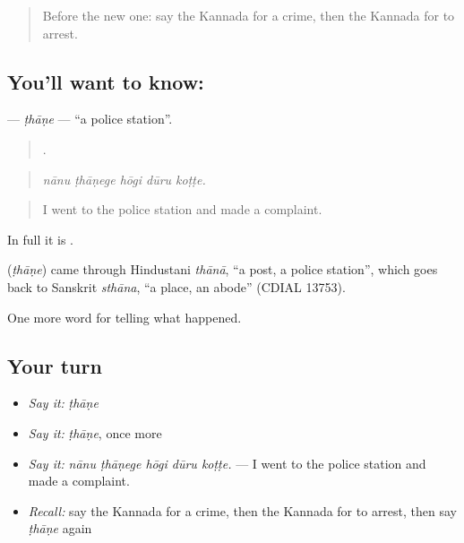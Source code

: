 \label{lesson:KA-C323-thane}



\begin{quote}
Before the new one: say the Kannada for a crime, then the Kannada for to arrest.
\end{quote}

\subsection*{You'll want to know: }
\textbf{} — \emph{ṭhāṇe} — \textquotedblleft{}a police station\textquotedblright{}.

\begin{quote}
    .
\end{quote}

\begin{quote}
\emph{nānu ṭhāṇege hōgi dūru koṭṭe.}
\end{quote}

\begin{quote}
I went to the police station and made a complaint.
\end{quote}

In full it is  .

\begin{cousinweb}
\textbf{} (\emph{ṭhāṇe}) came through Hindustani \emph{thānā}, \textquotedblleft{}a post, a police station\textquotedblright{}, which goes back to Sanskrit \emph{sthāna}, \textquotedblleft{}a place, an abode\textquotedblright{} (CDIAL 13753).
\end{cousinweb}

\begin{grammarlens}[title={What you've built}]
One more word for telling what happened.
\end{grammarlens}

\subsection*{Your turn}
\begin{itemize}
\raggedright
  \item \emph{Say it:} \emph{ṭhāṇe}
  \item \emph{Say it:} \emph{ṭhāṇe}, once more
  \item \emph{Say it:} \emph{nānu ṭhāṇege hōgi dūru koṭṭe.} — I went to the police station and made a complaint.
  \item \emph{Recall:} say the Kannada for a crime, then the Kannada for to arrest, then say \emph{ṭhāṇe} again
\end{itemize}

